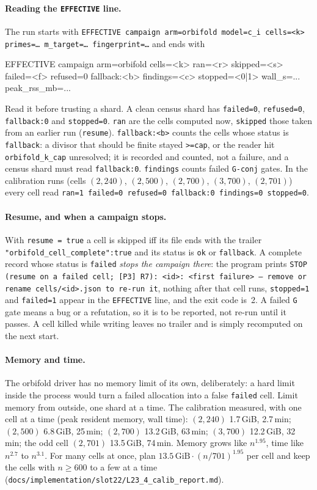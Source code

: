 \documentclass[11pt,openany]{report}
\newcommand{\file}[1]{\nolinkurl{#1}}
\newcommand{\vb}[1]{\texttt{#1}}
\begin{document}
\paragraph{Reading the \texttt{EFFECTIVE} line.} The run starts with
\texttt{EFFECTIVE campaign arm=orbifold model=c\_i cells=<k> primes=\dots{} m\_target=\dots{} fingerprint=\dots} and ends with
\begin{shell}
EFFECTIVE campaign arm=orbifold cells=<k> ran=<r> skipped=<s> failed=<f> refused=0 fallback:<b> findings=<c> stopped=<0|1> wall_s=... peak_rss_mb=...
\end{shell}
Read it before trusting a shard. A clean census shard has \texttt{failed=0}, \texttt{refused=0}, \texttt{fallback:0} and
\texttt{stopped=0}. \texttt{ran} are the cells computed now, \texttt{skipped} those taken from an earlier run
(\vb{resume}). \texttt{fallback:<b>} counts the cells whose status is \texttt{fallback}: a divisor that should be finite
stayed \texttt{>=cap}, or the reader hit \vb{orbifold\_k\_cap} unresolved; it is recorded and counted, not a failure,
and a census shard must read \texttt{fallback:0}. \texttt{findings} counts failed \texttt{G-conj} gates.
In the calibration runs (cells $(2,240)$, $(2,500)$, $(2,700)$, $(3,700)$, $(2,701)$) every cell read
\texttt{ran=1 failed=0 refused=0 fallback:0 findings=0 stopped=0}.

\paragraph{Resume, and when a campaign stops.} With \vb{resume = true} a cell is skipped iff its file ends with the
trailer \texttt{"orbifold\_cell\_complete":true} and its status is \texttt{ok} or \texttt{fallback}. A complete record
whose status is \texttt{failed} \emph{stops the campaign there}: the program prints
\texttt{STOP (resume on a failed cell; [P3] R7): <id>: <first failure> -- remove or rename cells/<id>.json to re-run it},
nothing after that cell runs, \texttt{stopped=1} and \texttt{failed=1} appear in the \texttt{EFFECTIVE} line, and the
exit code is~2. A failed \texttt{G} gate means a bug or a refutation, so it is to be reported, not re-run until it passes.
A cell killed while writing leaves no trailer and is simply recomputed on the next start.

\paragraph{Memory and time.} The orbifold driver has no memory limit of its own, deliberately: a hard limit inside the
process would turn a failed allocation into a false \texttt{failed} cell. Limit memory from outside, one shard at a time.
The calibration measured, with one cell at a time (peak resident memory, wall time): $(2,240)$ 1.7\,GiB, 2.7\,min;
$(2,500)$ 6.8\,GiB, 25\,min; $(2,700)$ 13.2\,GiB, 63\,min; $(3,700)$ 12.2\,GiB, 32\,min; the odd cell $(2,701)$
13.5\,GiB, 74\,min. Memory grows like $n^{1.95}$, time like $n^{2.7}$ to $n^{3.1}$. For many cells at once, plan
$13.5\,\mathrm{GiB}\cdot(n/701)^{1.95}$ per cell and keep the cells with $n\ge600$ to a few at a time
(\file{docs/implementation/slot22/L23\_4\_calib\_report.md}).
\end{document}

